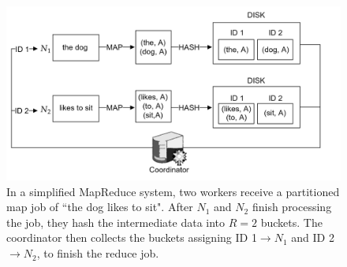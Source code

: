 \begin{figure}[h]
    \centering
    \includegraphics[width=\textwidth]{Sections/mapreduce/nwork.png}
    \caption{In a simplified MapReduce system, two workers receive a partitioned map job of ``the dog likes to sit". After $N_1$ and $N_2$ finish 
    processing the job, they hash the intermediate data into $R=2$ buckets. The coordinator then collects the buckets assigning ID 1$\to N_1$ and ID 2$\to N_2$, to finish the reduce job.}
    \label{fig:nwork}
\end{figure}


